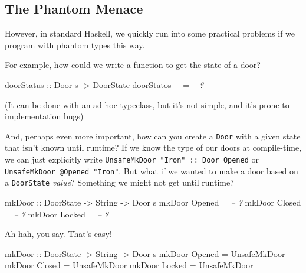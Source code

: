 \documentclass[]{article}
\newenvironment{Shaded}{\begin{snugshade}}{\end{snugshade}}
\newcommand{\CommentTok}[1]{\textcolor[rgb]{0.56,0.35,0.01}{\textit{#1}}}
\newcommand{\DataTypeTok}[1]{\textcolor[rgb]{0.13,0.29,0.53}{#1}}
\newcommand{\FunctionTok}[1]{\textcolor[rgb]{0.00,0.00,0.00}{#1}}
\newcommand{\NormalTok}[1]{#1}
\newcommand{\OtherTok}[1]{\textcolor[rgb]{0.56,0.35,0.01}{#1}}
\begin{document}
\hypertarget{the-phantom-menace}{%
\subsection{The Phantom Menace}\label{the-phantom-menace}}

However, in standard Haskell, we quickly run into some practical problems if we
program with phantom types this way.

For example, how could we write a function to get the state of a door?

\begin{Shaded}
\begin{Highlighting}[]
\OtherTok{doorStatus ::} \DataTypeTok{Door}\NormalTok{ s }\OtherTok{->} \DataTypeTok{DoorState}
\NormalTok{doorStatos _ }\FunctionTok{=} \CommentTok{-- ?}
\end{Highlighting}
\end{Shaded}

(It can be done with an ad-hoc typeclass, but it's not simple, and it's prone to
implementation bugs)

And, perhaps even more important, how can you create a \texttt{Door} with a
given state that isn't known until runtime? If we know the type of our doors at
compile-time, we can just explicitly write
\texttt{UnsafeMkDoor\ "Iron"\ ::\ Door\ \textquotesingle{}Opened} or
\texttt{UnsafeMkDoor\ @\textquotesingle{}Opened\ "Iron"}. But what if we wanted
to make a door based on a \texttt{DoorState} \emph{value}? Something we might
not get until runtime?

\begin{Shaded}
\begin{Highlighting}[]
\OtherTok{mkDoor ::} \DataTypeTok{DoorState} \OtherTok{->} \DataTypeTok{String} \OtherTok{->} \DataTypeTok{Door}\NormalTok{ s}
\NormalTok{mkDoor }\DataTypeTok{Opened} \FunctionTok{=} \CommentTok{-- ?}
\NormalTok{mkDoor }\DataTypeTok{Closed} \FunctionTok{=} \CommentTok{-- ?}
\NormalTok{mkDoor }\DataTypeTok{Locked} \FunctionTok{=} \CommentTok{-- ?}
\end{Highlighting}
\end{Shaded}

Ah hah, you say. That's easy!

\begin{Shaded}
\begin{Highlighting}[]
\OtherTok{mkDoor ::} \DataTypeTok{DoorState} \OtherTok{->} \DataTypeTok{String} \OtherTok{->} \DataTypeTok{Door}\NormalTok{ s}
\NormalTok{mkDoor }\DataTypeTok{Opened} \FunctionTok{=} \DataTypeTok{UnsafeMkDoor}
\NormalTok{mkDoor }\DataTypeTok{Closed} \FunctionTok{=} \DataTypeTok{UnsafeMkDoor}
\NormalTok{mkDoor }\DataTypeTok{Locked} \FunctionTok{=} \DataTypeTok{UnsafeMkDoor}
\end{Highlighting}
\end{Shaded}
\end{document}
